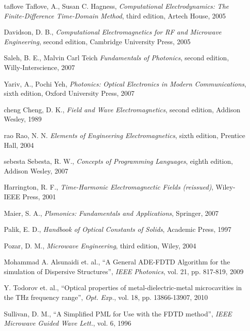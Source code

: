 \cleardoublepage
{}
\begin{thebibliography}{999}
  \bibitem
  {taflove}
  Taflove, A., Susan C. Hagness, 
  \textit{Computational Electrodynamics: The Finite-Difference Time-Domain Method}, third edition,
  Artech House,
  2005
 
  \bibitem
  {}
  Davidson, D. B.,
  \textit{Computational Electromagnetics for RF and Microwave Engineering}, second edition,
  Cambridge University Press,
  2005

  \bibitem
  {}
  Saleh, B. E., Malvin Carl Teich
  \textit{Fundamentals of Photonics}, second edition,
  Willy-Interscience,
  2007

  \bibitem
  {}
  Yariv, A., Pochi Yeh,
  \textit{Photonics: Optical Electronics in Modern Communications}, sixth edition,
  Oxford University Press, 
  2007

  \bibitem
  {cheng}
  Cheng, D. K.,
  \textit{Field and Wave Electromagnetics}, second edition,
  Addison Wesley,
  1989

  \bibitem
  {rao} 
  Rao, N. N.
  \textit{Elements of Engineering Electromagnetics}, sixth edition,
  Prentice Hall,
  2004

  \bibitem
  {sebesta}
  Sebesta, R. W.,
  \textit{Concepts of Programming Languages}, eighth edition,
  Addison Wesley,
  2007

  \bibitem
  {}
  Harrington, R. F.,
  \textit{Time-Harmonic Electromagnectic Fields (reissued)},
  Wiley-IEEE Press,
  2001

  \bibitem
  {}
  Maier, S. A.,
  \textit{Plsmonics: Fundamentals and Applications},
  Springer,
  2007

  \bibitem
  {}
  Palik, E. D.,
  \textit{Handbook of Optical Constants of Solids},
  Academic Press,
  1997

  \bibitem
  {}
  Pozar, D. M.,
  \textit{Microwave Engineering}, third edition,
  Wiley,
  2004

  \bibitem
  {}
  Mohammad A. Alsunaidi et. al.,
  ``A General ADE-FDTD Algorithm for the simulation of Dispersive Structures'',
  \textit{IEEE Photonics}, vol. 21, pp. 817-819,
  2009

  \bibitem
  {}
  Y. Todorov et. al.,
  ``Optical properties of metal-dielectric-metal microcavities in the THz frequency range'',
  \textit{Opt. Exp.}, vol. 18, pp. 13866-13907,
  2010

  \bibitem
  {}
  Sullivan, D. M.,
  ``A Simplified PML for Use with the FDTD method'',
  \textit{IEEE Microwave Guided Wave Lett.}, vol. 6,
  1996


\end{thebibliography}
